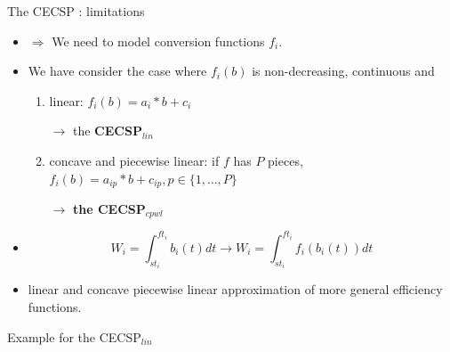  \begin{frame}{The CECSP : limitations}
   \begin{itemize}
   \item   $\Rightarrow$ We need to model conversion functions $f_i$.
     \vfill
   \item  We have consider the case where $f_i(b)$ is non-decreasing,
     continuous and  
     \begin{enumerate}
     \vspace{0.5cm}
     \item linear: $f_i(b)=a_i*b+c_i$ 

     \vspace{0.1cm}
       $\rightarrow$ the {\bf CECSP$_{lin}$}
     \vspace{0.5cm}
     \item concave and piecewise linear: if $f$ has $P$ pieces,
       $f_i(b)=a_{ip}*b+c_{ip}  , p \in \{1,\dots,P\}$

     \vspace{0.1cm}
       $\rightarrow$ {\bf the CECSP$_{cpwl}$} 
     \end{enumerate}
     \vfill
   \item   \[W_i=\int_{st_i}^{ft_i}b_i(t)dt \rightarrow W_i=\int_{st_i}^{ft_i}f_i(b_i(t))dt\]
     \vfill
   \item   linear and concave piecewise linear approximation of more
     general efficiency functions.
 \end{itemize}
   \vfill
 \end{frame}
 
 \begin{frame}{Example for the CECSP$_{lin}$}
   
 \end{frame}

